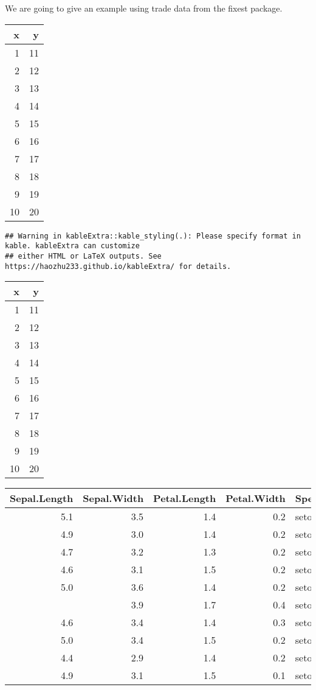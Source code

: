\documentclass[
  12pt,
]{article}
\begin{document}
We are going to give an example using trade data from the fixest package.

\begin{longtable}[]{@{}rr@{}}
\toprule()
x & y \\
\midrule()
\endhead
1 & 11 \\
2 & 12 \\
3 & 13 \\
4 & 14 \\
5 & 15 \\
6 & 16 \\
7 & 17 \\
8 & 18 \\
9 & 19 \\
10 & 20 \\
\bottomrule()
\end{longtable}

\begin{verbatim}
## Warning in kableExtra::kable_styling(.): Please specify format in kable. kableExtra can customize
## either HTML or LaTeX outputs. See https://haozhu233.github.io/kableExtra/ for details.
\end{verbatim}

\begin{longtable}[]{@{}rr@{}}
\toprule()
x & y \\
\midrule()
\endhead
1 & 11 \\
2 & 12 \\
3 & 13 \\
4 & 14 \\
5 & 15 \\
6 & 16 \\
7 & 17 \\
8 & 18 \\
9 & 19 \\
10 & 20 \\
\bottomrule()
\end{longtable}

\begin{tabular}{rrrrl}
\toprule
Sepal.Length & Sepal.Width & Petal.Length & Petal.Width & Species\\
\midrule
5.1 & 3.5 & 1.4 & 0.2 & setosa\\
4.9 & 3.0 & 1.4 & 0.2 & setosa\\
4.7 & 3.2 & 1.3 & 0.2 & setosa\\
4.6 & 3.1 & 1.5 & 0.2 & setosa\\
5.0 & 3.6 & 1.4 & 0.2 & setosa\\
\addlinespace
5.4 & 3.9 & 1.7 & 0.4 & setosa\\
4.6 & 3.4 & 1.4 & 0.3 & setosa\\
5.0 & 3.4 & 1.5 & 0.2 & setosa\\
4.4 & 2.9 & 1.4 & 0.2 & setosa\\
4.9 & 3.1 & 1.5 & 0.1 & setosa\\
\bottomrule
\end{tabular}
\end{document}
